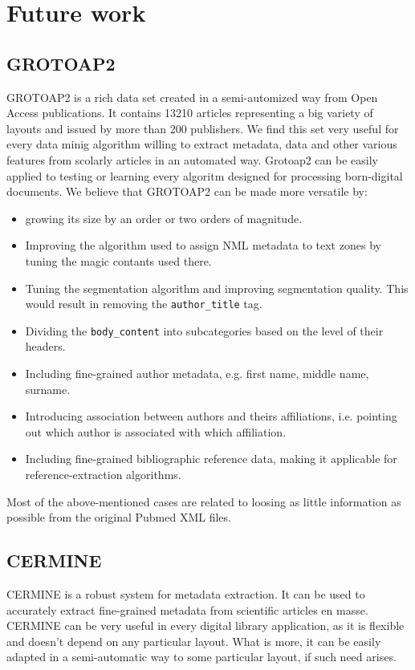 \section{Future work}
\subsection{GROTOAP2}
GROTOAP2 is a rich data set created in a semi-automized way from Open Access publications. It contains 13210 articles representing a big variety of layouts and issued by more than 200 publishers. We find this set very useful for every data minig algorithm willing to extract metadata, data and other various features from scolarly articles in an automated way. Grotoap2 can be easily applied to testing or learning every algoritm designed for processing born-digital documents.
\quad
We believe that GROTOAP2 can be made more versatile by:
\begin{itemize}
\item growing its size by an order or two orders of magnitude.
\item Improving the algorithm used to assign NML metadata to text zones by tuning the magic contants used there.
\item Tuning the segmentation algorithm and improving segmentation quality. This would result in removing the \verb+author_title+ tag.
\item Dividing the \verb+body_content+ into subcategories based on the level of their headers.
\item Including fine-grained author metadata, e.g. first name, middle name, surname.
\item Introducing association between authors and theirs affiliations, i.e. pointing out which author is associated with which affiliation.
\item Including fine-grained bibliographic reference data, making it applicable for reference-extraction algorithms.
\end{itemize}
Most of the above-mentioned cases are related to loosing as little information as possible from the original Pubmed XML files.

\subsection{CERMINE}
CERMINE is a robust system for metadata extraction. It can be used to accurately extract fine-grained metadata from scientific articles en masse. CERMINE can be very useful in every digital library application, as it is flexible and doesn't depend on any particular layout. What is more, it can be easily adapted in a semi-automatic way to some particular layout, if such need arises.


